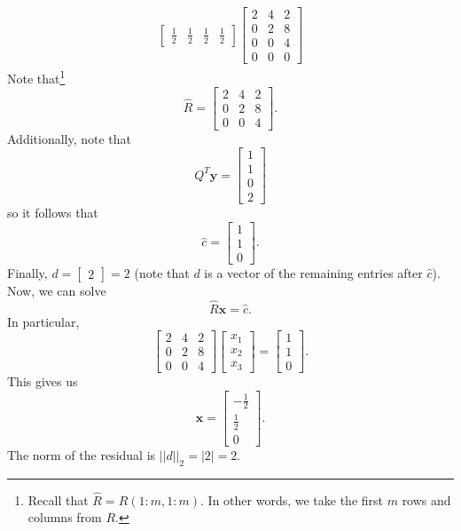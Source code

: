 \documentclass[letterpaper]{article}
\newcommand{\0}{\mathbf{0}}
\newcommand{\y}{\mathbf{y}}
\newcommand{\x}{\mathbf{x}}
\begin{document}
\begin{mdframed}
\begin{equation*}
\begin{aligned}
\begin{bmatrix}
                    \frac{1}{2} & \frac{1}{2} & \frac{1}{2} & \frac{1}{2}
                \end{bmatrix} \begin{bmatrix}
                    2 & 4 & 2 \\ 
                    0 & 2 & 8 \\ 
                    0 & 0 & 4 \\ 
                    0 & 0 & 0
                \end{bmatrix}
        \end{aligned}
    \end{equation*}
    Note that\footnote{Recall that $\hat{R} = R(1:m, 1:m)$. In other words, we take the first $m$ rows and columns from $R$.} \[\hat{R} = \begin{bmatrix}
        2 & 4 & 2 \\ 
        0 & 2 & 8 \\ 
        0 & 0 & 4
    \end{bmatrix}.\] Additionally, note that \[Q^T \y = \begin{bmatrix}
        1 \\ 1 \\ 0 \\ 2
    \end{bmatrix}\] so it follows that \[\hat{c} = \begin{bmatrix}
        1 \\ 1 \\ 0
    \end{bmatrix}.\] Finally, $d = \begin{bmatrix}
        2
    \end{bmatrix} = 2$ (note that $d$ is a vector of the remaining entries after $\hat{c}$). Now, we can solve \[\hat{R}\x = \hat{c}.\] In particular,
    \[\begin{bmatrix}
        2 & 4 & 2 \\ 
        0 & 2 & 8 \\ 
        0 & 0 & 4
    \end{bmatrix} \begin{bmatrix}
        x_1 \\ x_2 \\ x_3
    \end{bmatrix} = \begin{bmatrix}
        1 \\ 1 \\ 0
    \end{bmatrix}.\] This gives us \[\x = \begin{bmatrix}
        -\frac{1}{2} \\ \frac{1}{2} \\ 0
    \end{bmatrix}.\]
    The norm of the residual is $||d||_2 = |2| = 2$. 
\end{mdframed}
\end{document}
